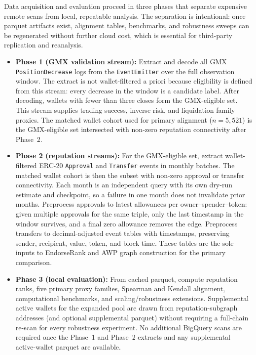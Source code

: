 
Data acquisition and evaluation proceed in three phases that separate expensive remote scans from local, repeatable analysis. The separation is intentional: once parquet artifacts exist, alignment tables, benchmarks, and robustness sweeps can be regenerated without further cloud cost, which is essential for third-party replication and reanalysis.

\begin{itemize}
\item \textbf{Phase 1 (GMX validation stream):} Extract and decode all GMX \texttt{PositionDecrease} logs from the \texttt{EventEmitter} over the full observation window. The extract is not wallet-filtered a priori because eligibility is defined from this stream: every decrease in the window is a candidate label. After decoding, wallets with fewer than three closes form the GMX-eligible set. This stream supplies trading-success, inverse-risk, and liquidation-family proxies. The matched wallet cohort used for primary alignment ($n=5{,}521$) is the GMX-eligible set intersected with non-zero reputation connectivity after Phase~2.

\item \textbf{Phase 2 (reputation streams):} For the GMX-eligible set, extract wallet-filtered ERC-20 \texttt{Approval} and \texttt{Transfer} events in monthly batches. The matched wallet cohort is then the subset with non-zero approval or transfer connectivity. Each month is an independent query with its own dry-run estimate and checkpoint, so a failure in one month does not invalidate prior months. Preprocess approvals to latest allowances per owner--spender--token: given multiple approvals for the same triple, only the last timestamp in the window survives, and a final zero allowance removes the edge. Preprocess transfers to decimal-adjusted event tables with timestamps, preserving sender, recipient, value, token, and block time. These tables are the sole inputs to EndorseRank and AWP graph construction for the primary comparison.

\item \textbf{Phase 3 (local evaluation):} From cached parquet, compute reputation ranks, five primary proxy families, Spearman and Kendall alignment, computational benchmarks, and scaling/robustness extensions. Supplemental active wallets for the expanded pool are drawn from reputation-subgraph addresses (and optional supplemental parquet) without requiring a full-chain re-scan for every robustness experiment. No additional BigQuery scans are required once the Phase~1 and Phase~2 extracts and any supplemental active-wallet parquet are available.


\end{itemize}
